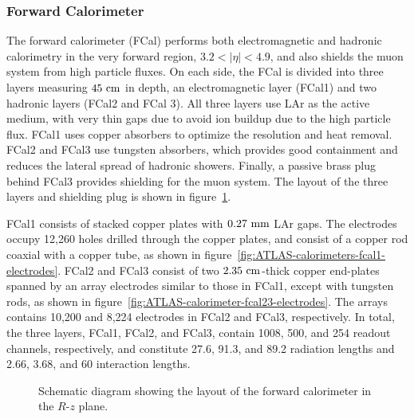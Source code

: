 \subsubsection{Forward Calorimeter}\label{sec:ATLAS-calorimeters-fcal}
The forward calorimeter (FCal) performs both electromagnetic and hadronic calorimetry in the very forward region, $3.2<|\eta|<4.9$, and also shields the muon system from high particle fluxes. On each side, the FCal is divided into three layers measuring $45~\mathrm{cm}$ in depth, an electromagnetic layer (FCal1) and two hadronic layers (FCal2 and FCal 3). All three layers use LAr as the active medium, with very thin gaps due to avoid ion buildup due to the high particle flux. FCal1 uses copper absorbers to optimize the resolution and heat removal. FCal2 and FCal3 use tungsten absorbers, which provides good containment and reduces the lateral spread of hadronic showers. Finally, a passive brass plug behind FCal3 provides shielding for the muon system. The layout of the three layers and shielding plug is shown in figure~\ref{fig:ATLAS-calorimeters-fcal-layout}. 

FCal1 consists of stacked copper plates with $0.27~\mathrm{mm}$ LAr gaps. The electrodes occupy 12,260 holes drilled through the copper plates, and consist of a copper rod coaxial with a copper tube, as shown in figure~\ref{fig:ATLAS-calorimeters-fcal1-electrodes}. FCal2 and FCal3 consist of two $2.35~\mathrm{cm}$-thick copper end-plates spanned by an array electrodes similar to those in FCal1, except with tungsten rods, as shown in figure~\ref{fig:ATLAS-calorimeter-fcal23-electrodes}. The arrays contains 10,200 and 8,224 electrodes in FCal2 and FCal3, respectively. In total, the three layers, FCal1, FCal2, and FCal3, contain 1008, 500, and 254 readout channels, respectively, and constitute 27.6, 91.3, and 89.2 radiation lengths and 2.66, 3.68, and 60 interaction lengths. 

\begin{figure}
	\centering
	\caption{Schematic diagram showing the layout of the forward calorimeter in the $R$-$z$ plane.}
	\label{fig:ATLAS-calorimeters-fcal-layout}
\end{figure}



